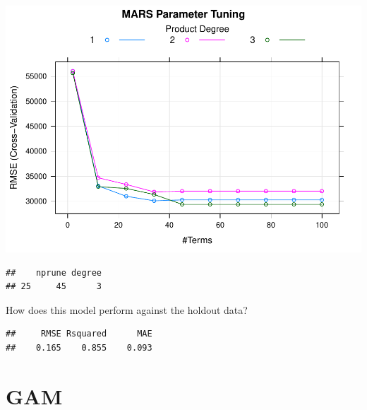 \documentclass[
]{book}
\newenvironment{Shaded}{\begin{snugshade}}{\end{snugshade}}
\newcommand{\DataTypeTok}[1]{\textcolor[rgb]{0.13,0.29,0.53}{#1}}
\newcommand{\KeywordTok}[1]{\textcolor[rgb]{0.13,0.29,0.53}{\textbf{#1}}}
\newcommand{\NormalTok}[1]{#1}
\newcommand{\OperatorTok}[1]{\textcolor[rgb]{0.81,0.36,0.00}{\textbf{#1}}}
\begin{document}
\includegraphics{data-sci_files/figure-latex/unnamed-chunk-125-1.pdf}

\begin{Shaded}
\end{Shaded}

\begin{verbatim}
##    nprune degree
## 25     45      3
\end{verbatim}

How does this model perform against the holdout data?

\begin{Shaded}
\end{Shaded}

\begin{verbatim}
##     RMSE Rsquared      MAE 
##    0.165    0.855    0.093
\end{verbatim}

\hypertarget{gam}{%
\section{GAM}\label{gam}}
\end{document}
